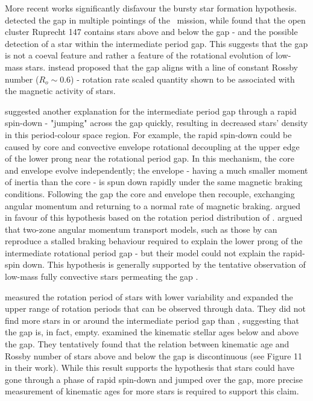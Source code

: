 More recent works significantly disfavour the bursty star formation hypothesis.
\citet{gordon_stellar_2021} detected the gap in multiple pointings of the \ktoo \ mission, while \citet{curtis_when_2020} found that the open cluster Ruprecht 147 contains stars above and below the gap - and the possible detection of a star within the intermediate period gap.
This suggests that the gap is not a coeval feature and rather a feature of the rotational evolution of low-mass stars.
\citet{curtis_when_2020} instead proposed that the gap aligns with a line of constant Rossby number ($R_o\sim 0.6$) - rotation rate scaled quantity shown to be associated with the magnetic activity of stars.

\citep{mcquillan_rotation_2014} suggested another explanation for the intermediate period gap through a rapid spin-down - "jumping" across the gap quickly, resulting in decreased stars' density in this period-colour space region.
For example, the rapid spin-down could be caused by core and convective envelope rotational decoupling at the upper edge of the lower prong near the rotational period gap.
In this mechanism, the core and envelope evolve independently; the envelope - having a much smaller moment of inertia than the core - is spun down rapidly under the same magnetic braking conditions.
Following the gap the core and envelope then recouple, exchanging angular momentum and returning to a normal rate of magnetic braking. 
\citet{gordon_stellar_2021} argued in favour of this hypothesis based on the rotation period distribution of \ktoo{}. 
\citet{curtis_when_2020} argued that two-zone angular momentum transport models, such as those by \citet{spada_competing_2020} can reproduce a stalled braking behaviour required to explain the lower prong of the intermediate rotational period gap - but their model could not explain the rapid-spin down.
This hypothesis is generally supported by the tentative observation of low-mass fully convective stars permeating the gap \citep{lu_bridging_2022}.

\citet{santos_surface_2021} measured the rotation period of stars with lower variability and expanded the upper range of rotation periods that can be observed through \kepler{} data.
They did not find more stars in or around the intermediate period gap than \citet{mcquillan_rotation_2014}, suggesting that the gap is, in fact, empty.
\citet{lu_bridging_2022} examined the kinematic stellar ages below and above the gap.
They tentatively found that the relation between kinematic age and Rossby number of stars above and below the gap is discontinuous (see Figure 11 in their work).
While this result supports the hypothesis that stars could have gone through a phase of rapid spin-down and jumped over the gap, more precise measurement of kinematic ages for more stars is required to support this claim.

